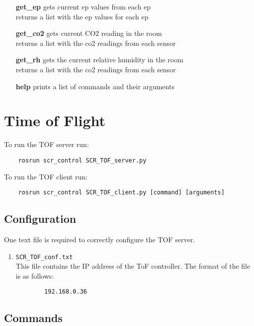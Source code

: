 \documentclass[twoside]{article}
\begin{document}
\begin{enumerate}
		\item[\bf get\_ep] gets current ep values from each ep \\
		returns a list with the ep values for each ep
		
		\item[\bf get\_co2] gets current CO2 reading in the room \\
		returns a list with the co2 readings from each sensor
		
		\item[\bf get\_rh] gets the current relative humidity in the room \\
		returns a list with the co2 readings from each sensor
		
		\item[\bf help] prints a list of commands and their arguments
	\end{enumerate}

	\section{Time of Flight}
 	
	To run the TOF server run:
	\begin{verbatim}
	rosrun scr_control SCR_TOF_server.py
	\end{verbatim}
	
	To run the TOF client run:
	\begin{verbatim}
	rosrun scr_control SCR_TOF_client.py [command] [arguments]
	\end{verbatim}
	
	\subsection{Configuration}
	One text file is required to correctly configure the TOF server.
	
	\begin{enumerate}
		\item \verb|SCR_TOF_conf.txt|\\
		This file contains the IP address of the ToF controller. The format of the file is as follows:
		
		\begin{verbatim}
		192.168.0.36
		\end{verbatim}
		
	\end{enumerate}
	
	\subsection{Commands}
	
\end{document}
